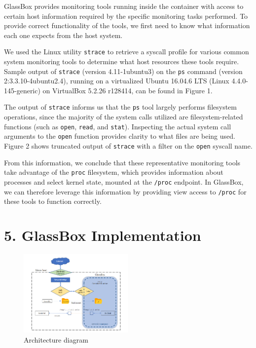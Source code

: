 \documentclass{proc}
\begin{document}
GlassBox provides monitoring tools running inside the container with access to certain host information required by the specific monitoring tasks performed. To provide correct functionality of the tools, we first need to know what information each one expects from the host system.

We used the Linux utility \texttt{strace} to retrieve a syscall profile for various common system monitoring tools to determine what host resources these tools require. Sample output of \texttt{strace} (version 4.11-1ubuntu3) on the \texttt{ps} command (version 2:3.3.10-4ubuntu2.4), running on a virtualized Ubuntu 16.04.6 LTS (Linux 4.4.0-145-generic) on VirtualBox 5.2.26 r128414, can be found in Figure 1.

The output of \texttt{strace} informs us that the \texttt{ps} tool largely performs filesystem operations, since the majority of the system calls utilized are filesystem-related functions (such as \texttt{open}, \texttt{read}, and \texttt{stat}). Inspecting the actual system call arguments to the \texttt{open} function provides clarity to what files are being used. Figure 2 shows truncated output of \texttt{strace} with a filter on the \texttt{open} syscall name.

From this information, we conclude that these representative monitoring tools take advantage of the \texttt{proc} filesystem, which provides information about processes and select kernel state, mounted at the \texttt{/proc} endpoint. In GlassBox, we can therefore leverage this information by providing view access to \texttt{/proc} for these tools to function correctly.

\section*{5. GlassBox Implementation}

\begin{figure}
\includegraphics[width=0.5\textwidth]{architecture}
\caption{Architecture diagram}
\end{figure}
\end{document}
